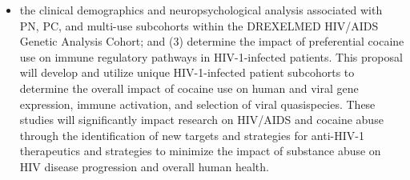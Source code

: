 \documentclass[a4paper,11pt]{article}
\makeatletter
\newenvironment{fullwidth}
    {\par
     \setlength{\@totalleftmargin}{0pt}%
     \setlength{\linewidth}{\hsize}%
     \list{}{\setlength{\leftmargin}{0pt}}
     \item\relax}
    {\endlist}
\makeatother
\begin{document}
\begin{enumerate}
\begin{itemize}
\begin{fullwidth}
the clinical demographics and neuropsychological analysis associated with PN, PC, and multi-use subcohorts within the DREXELMED HIV/AIDS Genetic Analysis Cohort; and (3) determine the impact of preferential cocaine use on immune regulatory pathways in HIV-1-infected patients.  This proposal will develop and utilize unique HIV-1-infected patient subcohorts to determine the overall impact of cocaine use on human and viral gene expression, immune activation, and selection of viral quasispecies.  These studies will significantly impact research on HIV/AIDS and cocaine abuse through the identification of new targets and strategies for anti-HIV-1 therapeutics and strategies to minimize the impact of substance abuse on HIV disease progression and overall human health.
   \end{fullwidth}


\end{itemize}
\end{enumerate}
\end{document}
